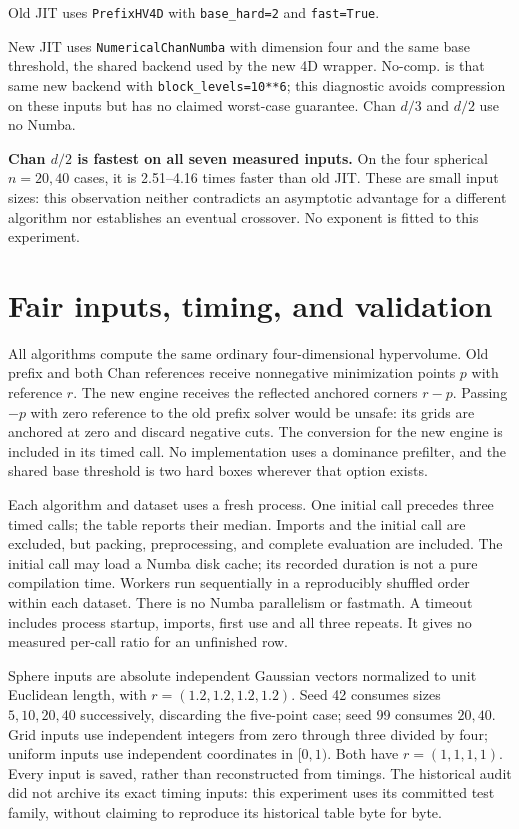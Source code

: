 \documentclass[12pt,a4paper]{article}
\begin{document}
Old JIT uses \texttt{PrefixHV4D} with \texttt{base\_hard=2} and
\texttt{fast=True}.

New JIT uses \texttt{NumericalChanNumba} with
dimension four and the same base threshold, the shared backend used by
the new 4D wrapper. No-comp. is that same new backend with
\texttt{block\_levels=10**6}; this diagnostic avoids compression on these
inputs but has no claimed worst-case guarantee. Chan $d/3$ and $d/2$ use no Numba.

\textbf{Chan $d/2$ is fastest on all seven measured inputs.} On the four
spherical $n=20,40$ cases, it is 2.51--4.16 times faster than old JIT.
These are small input sizes: this observation neither contradicts an asymptotic
advantage for a different algorithm nor establishes an eventual crossover.
No exponent is fitted to this experiment.

\section{Fair inputs, timing, and validation}
All algorithms compute the same ordinary four-dimensional hypervolume.
Old prefix and both Chan references receive nonnegative minimization points
$p$ with reference $r$. The new engine receives the reflected anchored corners
$r-p$. Passing $-p$ with zero reference to the old prefix solver would be
unsafe: its grids are anchored at zero and discard negative cuts.
The conversion for the new engine is included in its timed call.
No implementation uses a dominance prefilter, and the shared base threshold is
two hard boxes wherever that option exists.

Each algorithm and dataset uses a fresh process. One initial call precedes
three timed calls; the table reports their median. Imports and the initial
call are excluded, but packing, preprocessing, and complete evaluation are
included. The initial call may load a Numba disk cache; its recorded duration
is not a pure compilation time. Workers run sequentially in a reproducibly
shuffled order within each dataset. There is no Numba parallelism or fastmath.
A timeout includes process startup, imports, first use and all three repeats.
It gives no measured per-call ratio for an unfinished row.

Sphere inputs are absolute independent Gaussian vectors normalized to unit
Euclidean length, with $r=(1.2,1.2,1.2,1.2)$. Seed 42 consumes sizes
$5,10,20,40$ successively, discarding the five-point case; seed 99 consumes
$20,40$. Grid inputs use independent integers from zero through three divided
by four; uniform inputs use independent coordinates in $[0,1)$. Both have
$r=(1,1,1,1)$. Every input is saved, rather than reconstructed from timings.
The historical audit did not archive its exact timing inputs: this experiment
uses its committed test family, without claiming to reproduce its historical
table byte for byte.
\end{document}
